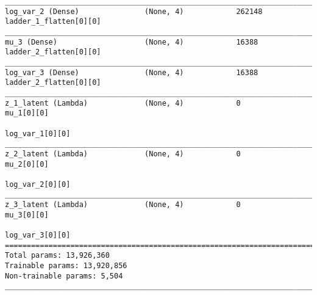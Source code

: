 \begin{lstlisting}[caption={\textsc{Mnist}-\ac{VLAE}-\ac{GAN} Encoder},captionpos=b,basicstyle=\tiny, label={lst:mnist-vlae-gan-encoder}]
__________________________________________________________________________________________________
log_var_2 (Dense)               (None, 4)            262148      ladder_1_flatten[0][0]
__________________________________________________________________________________________________
mu_3 (Dense)                    (None, 4)            16388       ladder_2_flatten[0][0]
__________________________________________________________________________________________________
log_var_3 (Dense)               (None, 4)            16388       ladder_2_flatten[0][0]
__________________________________________________________________________________________________
z_1_latent (Lambda)             (None, 4)            0           mu_1[0][0]
                                                                 log_var_1[0][0]
__________________________________________________________________________________________________
z_2_latent (Lambda)             (None, 4)            0           mu_2[0][0]
                                                                 log_var_2[0][0]
__________________________________________________________________________________________________
z_3_latent (Lambda)             (None, 4)            0           mu_3[0][0]
                                                                 log_var_3[0][0]
==================================================================================================
Total params: 13,926,360
Trainable params: 13,920,856
Non-trainable params: 5,504
__________________________________________________________________________________________________
\end{lstlisting}